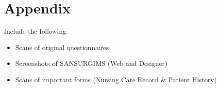\section{Appendix}

Include the following:
\begin{itemize}
\item Scans of original questionnaires
\item Screenshots of SANSURGIMS (Web and Designer)
\item Scans of important forms (Nursing Care Record & Patient History)
\end{itemize}